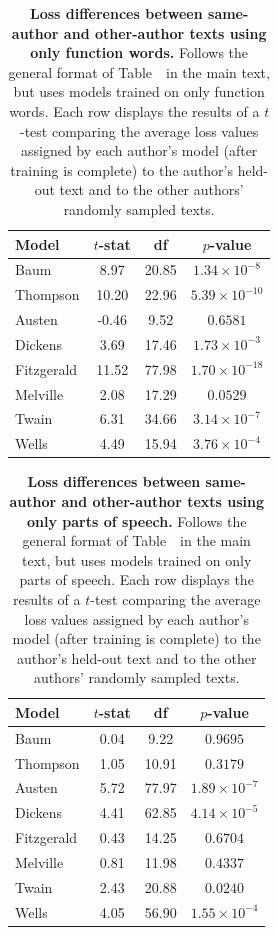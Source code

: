 \documentclass[10pt]{article}
\begin{document}
\begin{table}[h]
\centering
\small
\begin{tabular}{lccc}
\hline
\textbf{Model} & \textbf{$t$-stat} & \textbf{df} & \textbf{$p$-value}\\
\hline
Baum         & 8.97 & 20.85 & $1.34 \times 10^{-8}$  \\
Thompson     & 10.20 & 22.96 & $5.39 \times 10^{-10}$  \\
Austen       & -0.46 & 9.52 & $0.6581$  \\
Dickens      & 3.69 & 17.46 & $1.73 \times 10^{-3}$  \\
Fitzgerald   & 11.52 & 77.98 & $1.70 \times 10^{-18}$  \\
Melville     & 2.08 & 17.29 & $0.0529$  \\
Twain        & 6.31 & 34.66 & $3.14 \times 10^{-7}$  \\
Wells        & 4.49 & 15.94 & $3.76 \times 10^{-4}$  \\
\hline
\end{tabular}

\caption{\textbf{Loss differences between same-author and other-author texts
using only function words.} Follows the general format of Table~\authortable~in
the main text, but uses models trained on only function words. Each row displays
the results of a $t$-test comparing the average loss values assigned by each
author's model (after training is complete) to the author's held-out text and
to the other authors' randomly sampled texts.}

\label{tab:t-tests-function}
\end{table}

\begin{table}[h]
\centering
\small
\begin{tabular}{lccc}
\hline
\textbf{Model} & \textbf{$t$-stat} & \textbf{df} & \textbf{$p$-value}\\
\hline
Baum         & 0.04 & 9.22 & $0.9695$  \\
Thompson     & 1.05 & 10.91 & $0.3179$  \\
Austen       & 5.72 & 77.97 & $1.89 \times 10^{-7}$  \\
Dickens      & 4.41 & 62.85 & $4.14 \times 10^{-5}$  \\
Fitzgerald   & 0.43 & 14.25 & $0.6704$  \\
Melville     & 0.81 & 11.98 & $0.4337$  \\
Twain        & 2.43 & 20.88 & $0.0240$  \\
Wells        & 4.05 & 56.90 & $1.55 \times 10^{-4}$  \\
\hline
\end{tabular}

\caption{\textbf{Loss differences between same-author and other-author texts
using only parts of speech.} Follows the general format of Table~\authortable~in
the main text, but uses models trained on only parts of speech. Each row displays
the results of a $t$-test comparing the average loss values assigned by each
author's model (after training is complete) to the author's held-out text and
to the other authors' randomly sampled texts.}

\label{tab:t-tests-pos}
\end{table}
\end{document}
